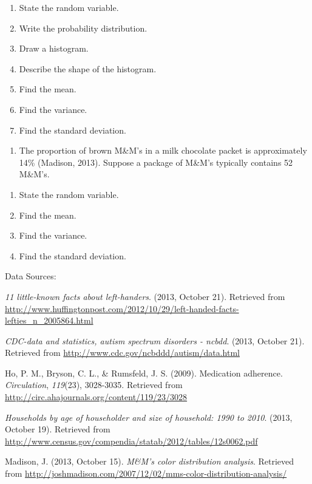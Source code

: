 \documentclass[]{book}
\providecommand{\tightlist}{%
  \setlength{\itemsep}{0pt}\setlength{\parskip}{0pt}}
\begin{document}
\begin{enumerate}
\def\labelenumi{\alph{enumi}.}
\item
  State the random variable.
\item
  Write the probability distribution.
\item
  Draw a histogram.
\item
  Describe the shape of the histogram.
\item
  Find the mean.
\item
  Find the variance.
\item
  Find the standard deviation.
\end{enumerate}

\begin{enumerate}
\def\labelenumi{\arabic{enumi}.}
\setcounter{enumi}{6}
\tightlist
\item
  The proportion of brown M\&M's in a milk chocolate packet is
  approximately 14\% (Madison, 2013). Suppose a package of M\&M's
  typically contains 52 M\&M's.
\end{enumerate}

\begin{enumerate}
\def\labelenumi{\alph{enumi}.}
\item
  State the random variable.
\item
  Find the mean.
\item
  Find the variance.
\item
  Find the standard deviation.
\end{enumerate}

Data Sources:

\emph{11 little-known facts about left-handers}. (2013, October 21).
Retrieved from
\url{http://www.huffingtonpost.com/2012/10/29/left-handed-facts-lefties_n_2005864.html}

\emph{CDC-data and statistics, autism spectrum disorders - ncbdd}. (2013,
October 21). Retrieved from \url{http://www.cdc.gov/ncbddd/autism/data.html}

Ho, P. M., Bryson, C. L., \& Rumsfeld, J. S. (2009). Medication
adherence. \emph{Circulation}, \emph{119}(23), 3028-3035. Retrieved from
\url{http://circ.ahajournals.org/content/119/23/3028}

\emph{Households by age of householder and size of household: 1990 to 2010}.
(2013, October 19). Retrieved from
\url{http://www.census.gov/compendia/statab/2012/tables/12s0062.pdf}

Madison, J. (2013, October 15). \emph{M\&M's color distribution analysis}.
Retrieved from
\url{http://joshmadison.com/2007/12/02/mms-color-distribution-analysis/}
\end{document}
